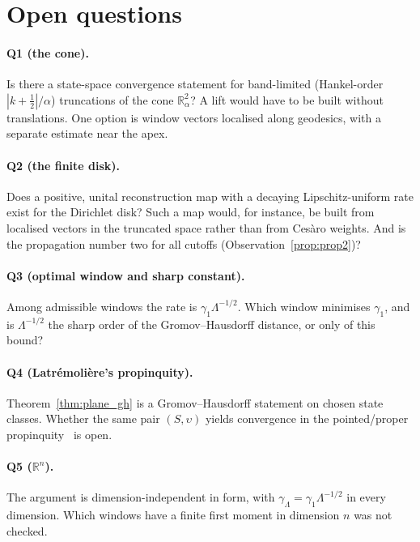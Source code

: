 \documentclass[11pt,a4paper]{article}
\theoremstyle{plain}
\theoremstyle{definition}
\newcommand{\R}{\mathbb{R}}
\begin{document}
\section{Open questions}
\label{sec:open}

\paragraph{Q1 (the cone).} Is there a state-space convergence statement
for band-limited (Hankel-order $|k+\tfrac12|/\alpha$) truncations of
the cone $\R^{2}_{\alpha}$? A lift would have to be built without
translations. One option is window vectors localised along geodesics,
with a separate estimate near the apex.

\paragraph{Q2 (the finite disk).} Does a positive, unital reconstruction
map with a decaying Lipschitz-uniform rate exist for the Dirichlet disk?
Such a map would, for instance, be built from localised vectors in the
truncated space rather than from Ces\`aro weights. And is the propagation
number two for all cutoffs (Observation~\ref{prop:prop2})?

\paragraph{Q3 (optimal window and sharp constant).} Among admissible
windows the rate is $\gamma_{1}\Lambda^{-1/2}$. Which window minimises
$\gamma_{1}$, and is $\Lambda^{-1/2}$ the sharp order of the
Gromov--Hausdorff distance, or only of this bound?

\paragraph{Q4 (Latr\'emoli\`ere's propinquity).} Theorem~\ref{thm:plane_gh}
is a Gromov--Hausdorff statement on chosen state classes. Whether the
same pair $(S,\upsilon)$ yields convergence in the pointed/proper
propinquity~\cite{latremoliere2025} is open.

\paragraph{Q5 ($\R^{n}$).} The argument is dimension-independent in form,
with $\gamma_{\Lambda}=\gamma_{1}\Lambda^{-1/2}$ in every dimension.
Which windows have a finite first moment in dimension $n$ was not checked.
\end{document}
